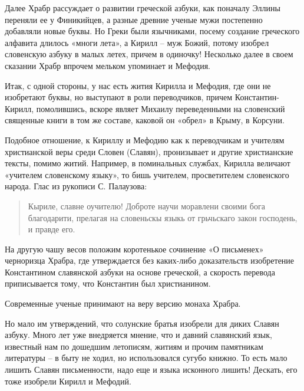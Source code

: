 \documentclass[a5paper,11pt,openany]{article}
\begin{document}
Далее Храбр рассуждает о развитии греческой азбуки, как поначалу Эллины переняли ее у Финикийцев, а разные древние ученые мужи постепенно добавляли новые буквы. Но Греки были язычниками, посему создание греческого алфавита длилось «многи лета», а Кирилл – муж Божий, потому изобрел словенскую азбуку в малых летех, причем в одиночку! Несколько далее в своем сказании Храбр впрочем мельком упоминает и Мефодия.

Итак, с одной стороны, у нас есть жития Кирилла и Мефодия, где они не изобретают буквы, но выступают в роли переводчиков, причем Константин-Кирилл, помолившись, вскоре являет Михаилу переведенными на словенский священные книги в том же составе, каковой он «обрел» в Крыму, в Корсуни.

Подобное отношение, к Кириллу и Мефодию как к переводчикам и учителям христианской веры среди Словен (Славян), пронизывает и другие христианские тексты, помимо житий. Например, в поминальных службах, Кирилла величают «учителем словенскому языку», то бишь учителем, просветителем словенского народа. Глас из рукописи С. Палаузова:

\begin{quotation}
Кыриле, славне оучителю! Доброте научи моравлени своими бога благодарити, прелагая на словеньскы языкь от грьчьскаго закон господень, и правде его.
\end{quotation}

На другую чашу весов положим коротенькое сочинение «О письменех» черноризца Храбра, где утверждается без каких-либо доказательств изобретение Константином славянской азбуки на основе греческой, а скорость перевода приписывается тому, что Константин был христианином.

Современные ученые принимают на веру версию монаха Храбра.

Но мало им утверждений, что солунские братья изобрели для диких Славян азбуку. Много лет уже внедряется мнение, что и давний славянский язык, известный нам по дошедшим летописям, житиям и прочим памятникам литературы – в быту не ходил, но использовался сугубо книжно. То есть мало лишить Славян письменности, надо еще и языка исконного лишить! Дескать, его тоже изобрели Кирилл и Мефодий.


\end{document}
